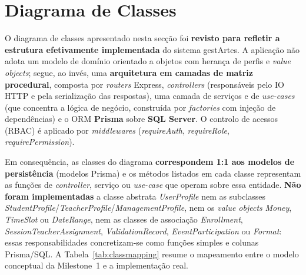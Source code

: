 \documentclass[12pt,a4paper]{report}
\begin{document}
\section{Diagrama de Classes}

O diagrama de classes apresentado nesta secção foi \textbf{revisto para refletir a
estrutura efetivamente implementada} do sistema gestArtes. A aplicação não adota um
modelo de domínio orientado a objetos com herança de perfis e \textit{value objects};
segue, ao invés, uma \textbf{arquitetura em camadas de matriz procedural}, composta
por \textit{routers} Express, \textit{controllers} (responsáveis pelo IO HTTP e pela
serialização das respostas), uma camada de serviços e de \textit{use-cases} (que
concentra a lógica de negócio, construída por \textit{factories} com injeção de
dependências) e o ORM \textbf{Prisma} sobre \textbf{SQL Server}. O controlo de acessos
(RBAC) é aplicado por \textit{middlewares} (\textit{requireAuth}, \textit{requireRole},
\textit{requirePermission}).

Em consequência, as classes do diagrama \textbf{correspondem 1:1 aos modelos de
persistência} (modelos Prisma) e os métodos listados em cada classe representam as
funções de \textit{controller}, serviço ou \textit{use-case} que operam sobre essa
entidade. \textbf{Não foram implementadas} a classe abstrata \textit{UserProfile} nem
as subclasses \textit{StudentProfile}/\textit{TeacherProfile}/\textit{ManagementProfile},
nem os \textit{value objects} \textit{Money}, \textit{TimeSlot} ou \textit{DateRange},
nem as classes de associação \textit{Enrollment}, \textit{SessionTeacherAssignment},
\textit{ValidationRecord}, \textit{EventParticipation} ou \textit{Format}: essas
responsabilidades concretizam-se como funções simples e colunas Prisma/SQL. A
Tabela~\ref{tab:classmapping} resume o mapeamento entre o modelo conceptual da
Milestone~1 e a implementação real.
\end{document}
